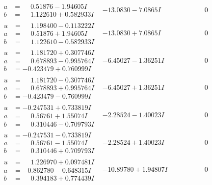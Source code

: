\documentclass[1p]{elsarticle_modified}
\theoremstyle{definition}
\begin{document}
$$\begin{array}{c|c|c}
\begin{aligned}
a &= \phantom{-}0.51876 - 1.94605 I \\
b &= \phantom{-}1.122610 + 0.582933 I\end{aligned}
 & -13.0830 - 7.0865 I & \phantom{-0.000000 } 0 \\ \hline\begin{aligned}
u &= \phantom{-}1.198400 - 0.113222 I \\
a &= \phantom{-}0.51876 + 1.94605 I \\
b &= \phantom{-}1.122610 - 0.582933 I\end{aligned}
 & -13.0830 + 7.0865 I & \phantom{-0.000000 } 0 \\ \hline\begin{aligned}
u &= \phantom{-}1.181720 + 0.307746 I \\
a &= \phantom{-}0.678893 - 0.995764 I \\
b &= -0.423479 + 0.760999 I\end{aligned}
 & -6.45027 - 1.36251 I & \phantom{-0.000000 } 0 \\ \hline\begin{aligned}
u &= \phantom{-}1.181720 - 0.307746 I \\
a &= \phantom{-}0.678893 + 0.995764 I \\
b &= -0.423479 - 0.760999 I\end{aligned}
 & -6.45027 + 1.36251 I & \phantom{-0.000000 } 0 \\ \hline\begin{aligned}
u &= -0.247531 + 0.733819 I \\
a &= \phantom{-}0.56761 + 1.55074 I \\
b &= \phantom{-}0.310446 - 0.709793 I\end{aligned}
 & -2.28524 - 1.40023 I & \phantom{-0.000000 } 0 \\ \hline\begin{aligned}
u &= -0.247531 - 0.733819 I \\
a &= \phantom{-}0.56761 - 1.55074 I \\
b &= \phantom{-}0.310446 + 0.709793 I\end{aligned}
 & -2.28524 + 1.40023 I & \phantom{-0.000000 } 0 \\ \hline\begin{aligned}
u &= \phantom{-}1.226970 + 0.097481 I \\
a &= -0.862780 - 0.648315 I \\
b &= \phantom{-}0.394183 + 0.774439 I\end{aligned}
 & -10.89780 + 1.94807 I & \phantom{-0.000000 } 0 \\ \hline\begin{aligned}

\end{aligned}
\end{array}$$
\end{document}
